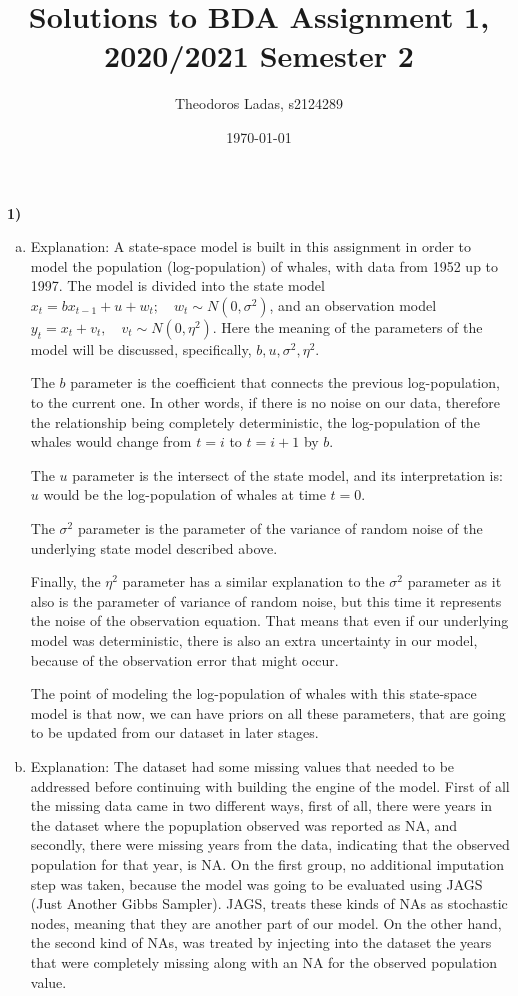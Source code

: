 \documentclass[12pt,a4paper]{article}
\begin{document}
\title{Solutions to BDA Assignment 1,
 2020/2021 Semester 2}
\author{Theodoros Ladas, s2124289}
\date{\today}
\maketitle

\vspace{1cm}

\noindent\textbf{1)}
\begin{enumerate}[(a)]
\item

Explanation: A state-space model is built in this assignment in order to model the population (log-population) of whales, with data from 1952 up to 1997. The model is divided into the state model 
$x_t = b x_{t-1}+u+w_t; \quad w_t\sim N(0,\sigma^2)$, and an observation model $y_t =x_{t}+v_t, \quad v_t\sim N(0,\eta^2)$. Here the meaning of the parameters of the model will be discussed, specifically, $b, u, \sigma^2, \eta^2$. 

The $b$ parameter is the coefficient that connects the previous log-population, to the current one. In other words, if there is no noise on our data, therefore the relationship being completely deterministic, the log-population of the whales would change from $t=i$ to $t=i+1$ by $b$. 

The $u$ parameter is the intersect of the state model, and its interpretation is: $u$ would be the log-population of whales at time $t=0$.

The $\sigma^2$ parameter is the parameter of the variance of random noise of the underlying state model described above. 

Finally, the $\eta^2$ parameter has a similar explanation to the $\sigma^2$ parameter as it also is the parameter of variance of random noise, but this time it represents the noise of the observation equation. That means that even if our underlying model was deterministic, there is also an extra uncertainty in our model, because of the observation error that might occur.

The point of modeling the log-population of whales with this state-space model is that now, we can have priors on all these parameters, that are going to be updated from our dataset in later stages. 

\item
Explanation: The dataset had some missing values that needed to be addressed before continuing with building the engine of the model. First of all the missing data came in two different ways, first of all, there were years in the dataset where the popuplation observed was reported as NA, and secondly, there were missing years from the data, indicating that the observed population for that year, is NA. On the first group, no additional imputation step was taken, because the model was going to be evaluated using JAGS (Just Another Gibbs Sampler). JAGS, treats these kinds of NAs as stochastic nodes, meaning that they are another part of our model. On the other hand, the second kind of NAs, was treated by injecting into the dataset the years that were completely missing along with an NA for the observed population value.


\end{enumerate}
\end{document}

